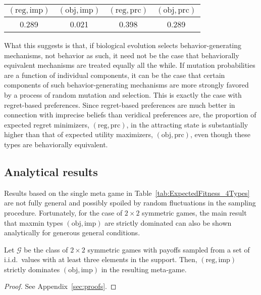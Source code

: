 \documentclass[fleqn,reqno,11pt]{article}
\begin{document}
\begin{center}
  \begin{tabular}{cccc}
    $(\text{reg}, \text{imp})$ & $(\text{obj}, \text{imp})$ & $(\text{reg},
      \text{prc})$ & $(\text{obj}, \text{prc})$ \\ \hline
    0.289  & 0.021 &   0.398 &    0.289 
  \end{tabular}
\end{center}

What this suggests is that, if biological evolution selects behavior-generating mechanisms, not
behavior as such, it need not be the case that behaviorally equivalent mechanisms are treated
equally all the while. If mutation probabilities are a function of individual components, it can be the case that
certain components of such behavior-generating mechanisms are more strongly favored by a process of random mutation and
selection. This is exactly the case with regret-based preferences. Since regret-based preferences are much better in connection with imprecise
beliefs than veridical preferences are, the proportion of expected regret minimizers,
$(\text{reg}, \text{prc})$, in the attracting state is substantially higher than that of
expected utility maximizers, $(\text{obj}, \text{prc})$, even though these types are
behaviorally equivalent.

\subsection{Analytical results}
\label{sec:analytical-results}

Results based on the single meta game in Table~\ref{tab:ExpectedFitness_4Types} are not fully general and possibly spoiled by random
fluctuations in the sampling procedure. Fortunately, for the case of $2 \times 2$ symmetric
games, the main result that maxmin types $(\text{obj}, \text{imp})$ are strictly dominated can
also be shown analytically for generous general conditions.

\begin{proposition} \label{proposition1}
  Let $\mathcal{G}$ be the class of $2 \times 2$ symmetric games with payoffs sampled from a
  set of i.i.d.~values with at least three elements in the support. Then,
  $(\text{reg}, \text{imp})$ strictly dominates $(\text{obj}, \text{imp})$ in the resulting
  meta-game.
\end{proposition}

\begin{proof}
See Appendix~\ref{sec:proofs}.
\end{proof}
\end{document}
